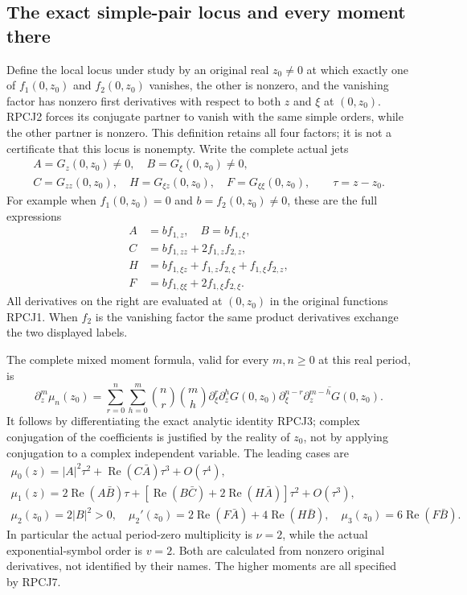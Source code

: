 \documentclass[11pt]{article}
\begin{document}
\subsection{The exact simple-pair locus and every moment there}
Define the local locus under study by an original real
$z_0\ne0$ at which exactly one of $f_1(0,z_0)$ and $f_2(0,z_0)$
vanishes, the other is nonzero, and the vanishing factor has nonzero
first derivatives with respect to both $z$ and $\xi$ at $(0,z_0)$.
RPCJ2 forces its conjugate partner to vanish with the same simple
orders, while the other partner is nonzero. This definition retains
all four factors; it is not a certificate that this locus is nonempty.
Write the complete actual jets
\[
 \begin{gathered}
 A=G_z(0,z_0)\ne0,\quad B=G_\xi(0,z_0)\ne0,\\
 C=G_{zz}(0,z_0),\quad H=G_{\xi z}(0,z_0),\quad
 F=G_{\xi\xi}(0,z_0),\qquad \tau=z-z_0.
 \end{gathered}\tag{RPCJ5}
\]
For example when $f_1(0,z_0)=0$ and $b=f_2(0,z_0)\ne0$,
these are the full expressions
\[
 \begin{split}
 A&=b f_{1,z},\quad B=b f_{1,\xi},\\
 C&=b f_{1,zz}+2f_{1,z}f_{2,z},\\
 H&=b f_{1,\xi z}+f_{1,z}f_{2,\xi}+f_{1,\xi}f_{2,z},\\
 F&=b f_{1,\xi\xi}+2f_{1,\xi}f_{2,\xi}.
 \end{split}\tag{RPCJ6}
\]
All derivatives on the right are evaluated at $(0,z_0)$ in the
original functions RPCJ1. When $f_2$ is the vanishing factor the
same product derivatives exchange the two displayed labels.

The complete mixed moment formula, valid for every $m,n\ge0$ at
this real period, is
\[
 \partial_z^m\mu_n(z_0)=
 \sum_{r=0}^n\sum_{h=0}^m\binom nr\binom mh
 \partial_\xi^r\partial_z^hG(0,z_0)
 \overline{\partial_\xi^{n-r}\partial_z^{m-h}G(0,z_0)}.
 \tag{RPCJ7}
\]
It follows by differentiating the exact analytic identity RPCJ3;
complex conjugation of the coefficients is justified by the reality
of $z_0$, not by applying conjugation to a complex independent variable.
The leading cases are
\[
 \begin{gathered}
 \mu_0(z)=|A|^2\tau^2+\operatorname{Re}(C\bar A)\tau^3+O(\tau^4),\\
 \mu_1(z)=2\operatorname{Re}(A\bar B)\tau
       +[\operatorname{Re}(B\bar C)+2\operatorname{Re}(H\bar A)]
                                      \tau^2+O(\tau^3),\\
 \mu_2(z_0)=2|B|^2>0,\quad
 \mu_2'(z_0)=2\operatorname{Re}(F\bar A)+4\operatorname{Re}(H\bar B),
 \quad \mu_3(z_0)=6\operatorname{Re}(F\bar B).
 \end{gathered}\tag{RPCJ8}
\]
In particular the actual period-zero multiplicity is $\nu=2$,
while the actual exponential-symbol order is $v=2$.
Both are calculated from nonzero original derivatives, not identified
by their names. The higher moments are all specified by RPCJ7.
\end{document}
